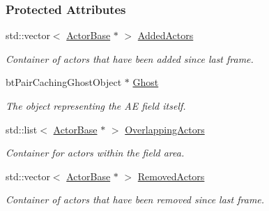 \subsubsection*{Protected Attributes}
\begin{DoxyCompactItemize}
\item 
\hypertarget{classMezzanine_1_1AreaEffect_a9a7e333c5e52fd5d7ae892f4691dbc16}{
std::vector$<$ \hyperlink{classMezzanine_1_1ActorBase}{ActorBase} $\ast$ $>$ \hyperlink{classMezzanine_1_1AreaEffect_a9a7e333c5e52fd5d7ae892f4691dbc16}{AddedActors}}
\label{classMezzanine_1_1AreaEffect_a9a7e333c5e52fd5d7ae892f4691dbc16}

\begin{DoxyCompactList}\small\item\em Container of actors that have been added since last frame. \item\end{DoxyCompactList}\item 
\hypertarget{classMezzanine_1_1AreaEffect_a16427c9805ea4c87faa84715ec04f97d}{
btPairCachingGhostObject $\ast$ \hyperlink{classMezzanine_1_1AreaEffect_a16427c9805ea4c87faa84715ec04f97d}{Ghost}}
\label{classMezzanine_1_1AreaEffect_a16427c9805ea4c87faa84715ec04f97d}

\begin{DoxyCompactList}\small\item\em The object representing the AE field itself. \item\end{DoxyCompactList}\item 
\hypertarget{classMezzanine_1_1AreaEffect_a9a1dbe79efda62adad5f56b5f93813ca}{
std::list$<$ \hyperlink{classMezzanine_1_1ActorBase}{ActorBase} $\ast$ $>$ \hyperlink{classMezzanine_1_1AreaEffect_a9a1dbe79efda62adad5f56b5f93813ca}{OverlappingActors}}
\label{classMezzanine_1_1AreaEffect_a9a1dbe79efda62adad5f56b5f93813ca}

\begin{DoxyCompactList}\small\item\em Container for actors within the field area. \item\end{DoxyCompactList}\item 
\hypertarget{classMezzanine_1_1AreaEffect_adaab6a94b9c4a9cfdb917ff4ce3fcabf}{
std::vector$<$ \hyperlink{classMezzanine_1_1ActorBase}{ActorBase} $\ast$ $>$ \hyperlink{classMezzanine_1_1AreaEffect_adaab6a94b9c4a9cfdb917ff4ce3fcabf}{RemovedActors}}
\label{classMezzanine_1_1AreaEffect_adaab6a94b9c4a9cfdb917ff4ce3fcabf}

\begin{DoxyCompactList}\small\item\em Container of actors that have been removed since last frame. \item\end{DoxyCompactList}\end{DoxyCompactItemize}
